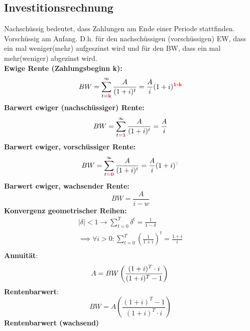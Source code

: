 \documentclass[leqno]{scrartcl}
\begin{document}
\begin{multicols}{4}
\subsection{Investitionsrechnung}

Nachschüssig bedeutet, dass Zahlungen am Ende einer Periode
stattfinden. Vorschüssig am Anfang. D.h. für den nachschüssigen (vorschüssigen) EW, dass ein mal weniger(mehr) aufgeszinst wird und für 
den BW, dass ein mal mehr(weniger) abgezinst wird.\\
\textbf{Ewige Rente (Zahlungsbeginn k):}
  \begin{equation*}
    BW = \sum^{\infty}_{t=\color{red}{\textbf{k}}}\frac{A}{(1+i)^t}=\frac{A}{i}(1+i)^{\color{red}{\textbf{1-k}}}
  \end{equation*}
\textbf{Barwert ewiger (nachschüssiger) Rente:}
  \begin{equation*}
    BW = \sum^{\infty}_{t=\color{red}{\textbf{1}}}\frac{A}{(1+i)^t}=\frac{A}{i}
  \end{equation*}
\textbf{Barwert ewiger, vorschüssiger  Rente:}
  \begin{equation*}
    BW = \sum^{\infty}_{t=\color{red}{\textbf{0}}}\frac{A}{(1+i)^t}=\frac{A}{i}(1+i)^{\color{lightgray}{\textbf{1}}}
  \end{equation*}
\textbf{Barwert ewiger, wachsender Rente:}
  \begin{equation*}
    BW =\frac{A}{i-w}
  \end{equation*}
\textbf{Konvergenz geometrischer Reihen:}
  \begin{equation*}\label{convergence}
    \begin{split}
    |\delta|<1 \rightarrow \sum^T_{t=0}\delta^t=\frac{1}{1-\delta}\\
    \implies \forall i > 0 : \sum^T_{t=0}\left(\frac{1}{1+i}\right)^t  = \frac{1+i}{i}\\
    \end{split}
  \end{equation*}
\textbf{Annuität}:\\
  \begin{equation*}
    A = BW \left(\frac{(1+i)^T \cdot i}{(1+i)^T-1}\right)\\
  \end{equation*}
\textbf{Rentenbarwert}:\\
  \begin{equation*}
    BW = A  \left(\frac{(1+i)^T-1}{(1+i)^T \cdot i}\right)
  \end{equation*}
\textbf{Rentenbarwert (wachsend)}\\

\end{multicols}
\end{document}
